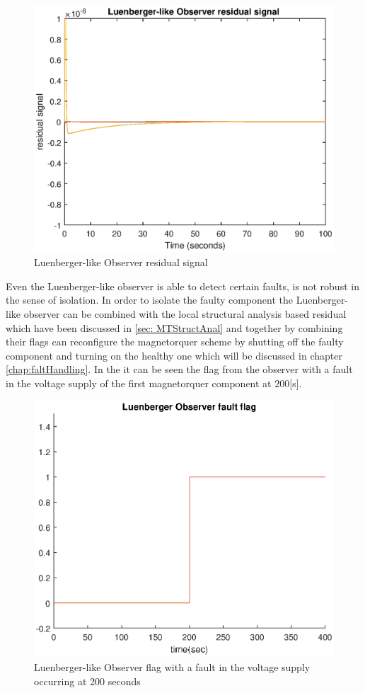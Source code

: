 \begin{figure}[H]
	\centering
	\includegraphics[width=0.7\linewidth]{figures/Observer_residual}
	\caption{Luenberger-like Observer residual signal }
	\label{fig:observerresidual}
\end{figure}
%
 Even the Luenberger-like observer is able to detect certain faults, is not robust in the sense of isolation. In order to isolate the faulty component the  Luenberger-like observer can be combined with the local structural analysis based residual which have been discussed in \ref{sec: MTStructAnal} and together by combining their flags can reconfigure the magnetorquer scheme by shutting off the faulty component and turning on the healthy one which will be discussed in chapter \ref{chap:faltHandling}. In the  it can be seen the flag from the observer with a fault in the voltage supply of the first magnetorquer component at $200$[s]. 
 \begin{figure}[H]
 	\centering
 	\includegraphics[width=0.7\linewidth]{figures/Luenberger_Observerflag}
 	\caption{Luenberger-like Observer flag with a fault in the voltage supply occurring at 200 seconds   }
 	\label{fig:obsflag}
 \end{figure}

%
